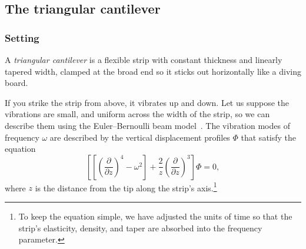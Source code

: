 \documentclass[pdftex]{sigma}
\numberwithin{equation}{section}
\begin{document}
\subsection{The triangular cantilever}\label{sec:catilever}
%
\subsubsection{Setting}
A {\em triangular cantilever} is a flexible strip with constant thickness and linearly tapered width, clamped at the broad end so it sticks out horizontally like a diving board.
\begin{center}
\end{center}
If you strike the strip from above, it vibrates up and down. Let us suppose the vibrations are small, and uniform across the width of the strip, so we can describe them using the Euler--Bernoulli beam model~\cite[Section 12.4]{genta2009vibration}. The vibration modes of frequency $\omega$ are described by the vertical displacement profiles $\Phi$ that satisfy the equation
\begin{equation}\label{eqn:triangular_cantilever}
 \left[\left[\left(\frac{\partial}{\partial z}\right)^4 - \omega^2\right] + \frac{2}{z}\left(\frac{\partial}{\partial z}\right)^3\right] \Phi = 0,
\end{equation}
where $z$ is the distance from the tip along the strip's axis.\footnote{To keep the equation simple, we have adjusted the units of time so that the strip's elasticity, density, and taper are absorbed into the frequency parameter.}
%
\end{document}
